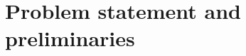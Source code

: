 \documentclass[smallcondensed,final]{svjour3}     %
\begin{document}






\section{Problem statement and preliminaries}
\label{sec:problem}
\end{document}
